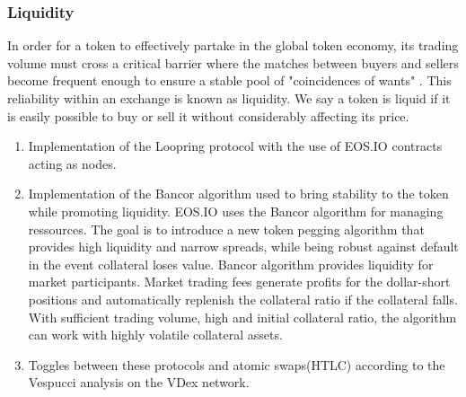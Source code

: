 \documentclass[]{article}
\begin{document}
	
	\subsubsection{Liquidity}
	In order for a token to effectively partake in the global token
	economy, its trading volume must cross a critical barrier where
	the matches between buyers and sellers become frequent enough to ensure a stable pool of "coincidences of wants" \cite{10}. 
	This reliability within an exchange is known as liquidity. We say a token is liquid if it is easily possible to buy or sell it without considerably affecting its price.
	
	\begin{enumerate} 
		\item Implementation of the Loopring protocol with the use of EOS.IO contracts acting as nodes.\cite{7}
		\item Implementation of the Bancor algorithm used to bring stability to the token while promoting liquidity.\cite{10}
		EOS.IO uses the Bancor algorithm  for managing ressources.
		The goal is to introduce a new token pegging algorithm that provides high liquidity and narrow spreads, while being robust against default in the event collateral loses value. Bancor algorithm provides liquidity for market participants. Market trading fees generate profits for the dollar-short positions and automatically replenish the collateral ratio if the collateral falls. With sufficient trading volume, high and initial collateral ratio, the algorithm can work with highly volatile collateral assets.\cite{25}
		\item Toggles between these protocols and atomic swaps(HTLC) according to the Vespucci analysis on the VDex network.
		\end{enumerate}
	
\end{document}
